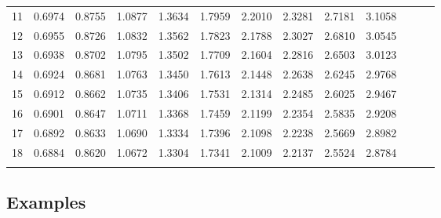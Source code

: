 \begin{frame}
{\begin{tabular}{l|llllllllllll}
 11 & 0.6974 & 0.8755 & 1.0877 & 1.3634 & 1.7959 & 2.2010 & 2.3281 & 2.7181 & 3.1058  \\[5pt] \arrayrulecolor{light-gray}\hline\arrayrulecolor{black}  
 12 & 0.6955 & 0.8726 & 1.0832 & 1.3562 & 1.7823 & 2.1788 & 2.3027 & 2.6810 & 3.0545  \\[5pt] \arrayrulecolor{light-gray}\hline\arrayrulecolor{black}  
 13 & 0.6938 & 0.8702 & 1.0795 & 1.3502 & 1.7709 & 2.1604 & 2.2816 & 2.6503 & 3.0123  \\[5pt] \arrayrulecolor{light-gray}\hline\arrayrulecolor{black}  
 14 & 0.6924 & 0.8681 & 1.0763 & 1.3450 & 1.7613 & 2.1448 & 2.2638 & 2.6245 & 2.9768  \\[12pt] \arrayrulecolor{light-gray}\hline\arrayrulecolor{black}  
 15 & 0.6912 & 0.8662 & 1.0735 & 1.3406 & 1.7531 & 2.1314 & 2.2485 & 2.6025 & 2.9467  \\[5pt] \arrayrulecolor{light-gray}\hline\arrayrulecolor{black}  
 16 & 0.6901 & 0.8647 & 1.0711 & 1.3368 & 1.7459 & 2.1199 & 2.2354 & 2.5835 & 2.9208  \\[5pt] \arrayrulecolor{light-gray}\hline\arrayrulecolor{black}  
 17 & 0.6892 & 0.8633 & 1.0690 & 1.3334 & 1.7396 & 2.1098 & 2.2238 & 2.5669 & 2.8982  \\[5pt] \arrayrulecolor{light-gray}\hline\arrayrulecolor{black}  
 18 & 0.6884 & 0.8620 & 1.0672 & 1.3304 & 1.7341 & 2.1009 & 2.2137 & 2.5524 & 2.8784  \\[5pt] \arrayrulecolor{light-gray}\hline\arrayrulecolor{black}  
\end{tabular}
}
\end{frame}


\subsection{Examples}

